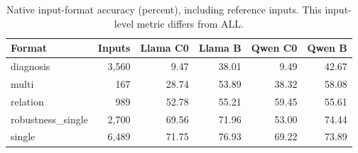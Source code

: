 \begin{table}[htbp]
\centering\small
\caption{Native input-format accuracy (percent), including reference inputs. This input-level metric differs from ALL.}
\label{tab:format-breakdown}
\setlength{\tabcolsep}{6pt}
\begin{tabular}{@{}lrrrrr@{}}
\toprule
Format & Inputs & Llama C0 & Llama B & Qwen C0 & Qwen B \\
\midrule
diagnosis & 3,560 & 9.47 & 38.01 & 9.49 & 42.67 \\
multi & 167 & 28.74 & 53.89 & 38.32 & 58.08 \\
relation & 989 & 52.78 & 55.21 & 59.45 & 55.61 \\
robustness\_single & 2,700 & 69.56 & 71.96 & 53.00 & 74.44 \\
single & 6,489 & 71.75 & 76.93 & 69.22 & 73.89 \\
\bottomrule
\end{tabular}
\end{table}
